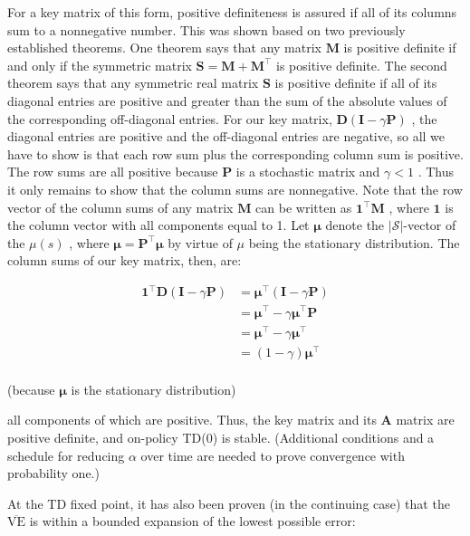\documentclass{article}
\begin{document}
For a key matrix of this form, positive definiteness is assured if all of its columns sum to a nonnegative number. This was shown based on two previously established theorems. One theorem says that any matrix $\mathbf{M}$ is positive definite if and only if 
the symmetric matrix $\mathbf { S } = \mathbf { M } + \mathbf { M } ^ { \top }$ is positive definite. The second theorem says that any symmetric real matrix $\mathbf{S}$ is positive definite if all of its diagonal entries are positive and greater than 
the sum of the absolute values of the corresponding off-diagonal entries. For our key matrix, $\mathbf { D } ( \mathbf { I } - \gamma \mathbf { P } )$ , the diagonal entries are positive and the off-diagonal entries are negative, so all we have to show is that 
each row sum plus the corresponding column sum is positive. The row sums are all positive because $\mathbf{P}$ is a stochastic matrix and $\gamma < 1$ . Thus it only remains to show that the column sums are nonnegative. Note that the row vector of the column sums 
of any matrix $\mathbf{M}$ can be written as $\mathbf { 1 } ^ { \top } \mathbf { M }$ , where $\mathbf { 1 }$ is the column vector with all components equal to 1. Let $\pmb { \mu }$ denote the $|\mathcal{S}|$-vector of the $\mu ( s )$ , where $\pmb { \mu } = \mathbf { P } ^ { \top } \pmb { \mu }$ 
by virtue of $\mu$ being the stationary distribution. The column sums of our key matrix, then, are:

$$
\begin{aligned} { \mathbf { 1 } ^ { \top } \mathbf { D } ( \mathbf { I } - \gamma \mathbf { P } ) } & { { } = \pmb { \mu } ^ { \top } ( \mathbf { I } - \gamma \mathbf { P } ) } \\ { } & { { } = \pmb { \mu } ^ { \top } - \gamma \pmb { \mu } ^ { \top } \mathbf { P } } \\ { } & { { } = \pmb { \mu } ^ { \top } - \gamma \pmb { \mu } ^ { \top } } \\ { } & { { } = ( 1 - \gamma ) \pmb { \mu } ^ { \top } } \\ \end{aligned}
$$

(because $\pmb { \mu }$ is the stationary distribution)

all components of which are positive. Thus, the key matrix and its $\mathbf{A}$ matrix are positive definite, and on-policy TD(0) is stable. (Additional conditions and a schedule for reducing $\alpha$ over time are needed to prove convergence with probability one.)

At the TD fixed point, it has also been proven (in the continuing case) that the $\overline { { \mathrm { V E } } }$ is within a bounded expansion of the lowest possible error:
\end{document}
